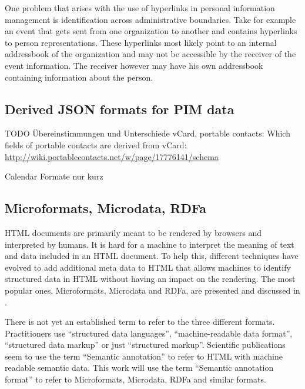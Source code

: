 \documentclass[12pt,a4paper]{scrartcl}		%
\begin{document}
One problem that arises with the use of hyperlinks in personal information
management is identification across administrative boundaries. Take for example
an event that gets sent from one organization to another and contains hyperlinks
to person representations. These hyperlinks most likely point to an internal
addressbook of the organization and may not be accessible by the receiver of the
event information. The receiver however may have his own addressbook containing
information about the person.

\subsection{Derived JSON formats for PIM data}

TODO Übereinstimmungen und Unterschiede vCard, portable contacts: Which fields of portable contacts are derived from vCard: \url{http://wiki.portablecontacts.net/w/page/17776141/schema}

Calendar Formate nur kurz

\subsection{Microformats, Microdata, RDFa}
\label{sec:microdata}

HTML documents are primarily meant to be rendered by browsers and interpreted by
humans. It is hard for a machine to interpret the meaning of text and data
included in an HTML document. To help this, different techniques have evolved to
add additional meta data to HTML that allows machines to identify structured
data in HTML without having an impact on the rendering. The most popular ones,
Microformats, Microdata and RDFa, are presented and discussed in
\cite{Tennison2012}.

There is not yet an established term to refer to the three different
formats. Practitioners use ``structured data languages''\cite{Sporny2011},
``machine-readable data format''\cite{Hickson2011}, ``structured data
markup''\cite{Goel2011} or just ``structured markup''. Scientific publications
seem to use the term ``Semantic annotation''\cite{instance7} to refer to HTML
with machine readable semantic data. This work will use the term ``Semantic
annotation format'' to refer to Microformats, Microdata, RDFa and similar
formats.
\end{document}

